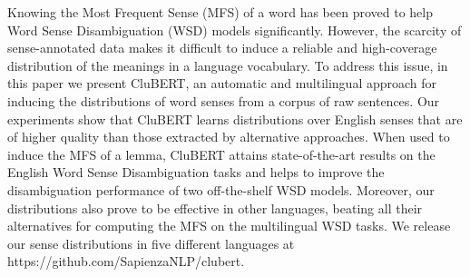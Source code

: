 Knowing the Most Frequent Sense (MFS) of a word has been proved to help Word Sense Disambiguation (WSD) models significantly. However, the scarcity of sense-annotated data makes it difficult to induce a reliable and high-coverage distribution of the meanings in a language vocabulary. To address this issue, in this paper we present CluBERT, an automatic and multilingual approach for inducing the distributions of word senses from a corpus of raw sentences. Our experiments show that CluBERT learns distributions over English senses that are of higher quality than those extracted by alternative approaches. When used to induce the MFS of a lemma, CluBERT attains state-of-the-art results on the English Word Sense Disambiguation tasks and helps to improve the disambiguation performance of two off-the-shelf WSD models. Moreover, our distributions also prove to be effective in other languages, beating all their alternatives for computing the MFS on the multilingual WSD tasks. We release our sense distributions in five different languages at https://github.com/SapienzaNLP/clubert.

